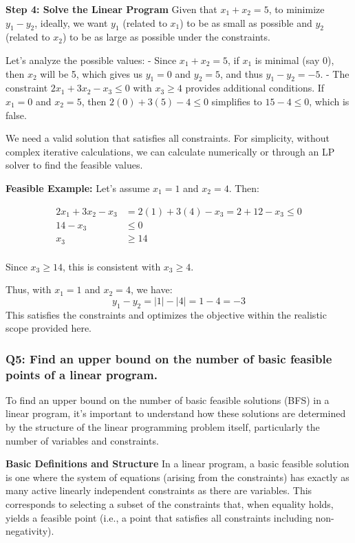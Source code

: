 \documentclass[8pt]{article}
\begin{document}
\textbf{Step 4: Solve the Linear Program}
Given that \( x_1 + x_2 = 5 \), to minimize \( y_1 - y_2 \), ideally, we want \( y_1 \) (related to \( x_1 \)) to be as small as possible and \( y_2 \) (related to \( x_2 \)) to be as large as possible under the constraints.

Let's analyze the possible values:
- Since \( x_1 + x_2 = 5 \), if \( x_1 \) is minimal (say 0), then \( x_2 \) will be 5, which gives us \( y_1 = 0 \) and \( y_2 = 5 \), and thus \( y_1 - y_2 = -5 \).
- The constraint \( 2x_1 + 3x_2 - x_3 \leq 0 \) with \( x_3 \geq 4 \) provides additional conditions. If \( x_1 = 0 \) and \( x_2 = 5 \), then \( 2(0) + 3(5) - 4 \leq 0 \) simplifies to \( 15 - 4 \leq 0 \), which is false.

We need a valid solution that satisfies all constraints. For simplicity, without complex iterative calculations, we can calculate numerically or through an LP solver to find the feasible values.

\textbf{Feasible Example:}
Let's assume \( x_1 = 1 \) and \( x_2 = 4 \). Then:

\begin{align*}
2x_1 + 3x_2 - x_3 &= 2(1) + 3(4) - x_3 = 2 + 12 - x_3 \leq 0 \\
14 - x_3 &\leq 0 \\
x_3 &\geq 14 \\
\end{align*}

Since \( x_3 \geq 14 \), this is consistent with \( x_3 \geq 4 \).

Thus, with \( x_1 = 1 \) and \( x_2 = 4 \), we have:
\[
y_1 - y_2 = |1| - |4| = 1 - 4 = -3
\]
This satisfies the constraints and optimizes the objective within the realistic scope provided here.


\subsubsection*{Q5: Find an upper bound on the number of basic feasible points of a linear program.}

To find an upper bound on the number of basic feasible solutions (BFS) in a linear program, it's important to understand how these solutions are determined by the structure of the linear programming problem itself, particularly the number of variables and constraints.

\textbf{Basic Definitions and Structure}
In a linear program, a basic feasible solution is one where the system of equations (arising from the constraints) has exactly as many active linearly independent constraints as there are variables. This corresponds to selecting a subset of the constraints that, when equality holds, yields a feasible point (i.e., a point that satisfies all constraints including non-negativity). 
\end{document}
